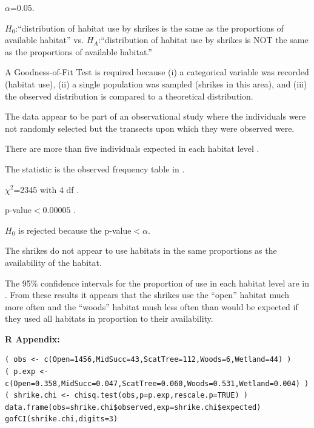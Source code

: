 \documentclass[10pt,openany]{book}\usepackage[]{graphicx}\usepackage[]{color}
\makeatletter
\newenvironment{kframe}{%
 \def\at@end@of@kframe{}%
 \ifinner\ifhmode%
  \def\at@end@of@kframe{\end{minipage}}%
  \begin{minipage}{\columnwidth}%
 \fi\fi%
 \def\FrameCommand##1{\hskip\@totalleftmargin \hskip-\fboxsep
 \colorbox{shadecolor}{##1}\hskip-\fboxsep
     \hskip-\linewidth \hskip-\@totalleftmargin \hskip\columnwidth}%
 \MakeFramed {\advance\hsize-\width
   \@totalleftmargin\z@ \linewidth\hsize
   \@setminipage}}%
 {\par\unskip\endMakeFramed%
 \at@end@of@kframe}
\newenvironment{knitrout}{}{} %
\makeatother
\begin{document}
\begin{Enumerate}
  \item $\alpha$=0.05.
  \item $H_{0}$:``distribution of habitat use by shrikes is the same as the proportions of available habitat'' vs. $H_{A}$:``distribution of habitat use by shrikes is NOT the same as the proportions of available habitat.''
  \item A Goodness-of-Fit Test is required because (i) a categorical variable was recorded (habitat use), (ii) a single population was sampled (shrikes in this area), and (iii) the observed distribution is compared to a theoretical distribution.
  \item The data appear to be part of an observational study where the individuals were not randomly selected but the transects upon which they were observed were.
  \item There are more than five individuals expected in each habitat level .
  \item The statistic is the observed frequency table in .
  \item $\chi^2$=2345 with 4 df .
  \item p-value$<0.00005$ .
  \item $H_{0}$ is rejected because the p-value$<\alpha$.
  \item The shrikes do not appear to use habitats in the same proportions as the availability of the habitat.
  \item The 95\% confidence intervals for the proportion of use in each habitat level are in . From these results it appears that the shrikes use the ``open'' habitat much more often and the ``woods'' habitat mush less often than would be expected if they used all habitats in proportion to their availability.
\end{Enumerate}

\begin{minipage}{\textwidth}
\textbf{R Appendix:}
\begin{knitrout}
\color{fgcolor}\begin{kframe}
\begin{verbatim}
( obs <- c(Open=1456,MidSucc=43,ScatTree=112,Woods=6,Wetland=44) )
( p.exp <- c(Open=0.358,MidSucc=0.047,ScatTree=0.060,Woods=0.531,Wetland=0.004) )
( shrike.chi <- chisq.test(obs,p=p.exp,rescale.p=TRUE) )
data.frame(obs=shrike.chi$observed,exp=shrike.chi$expected)
gofCI(shrike.chi,digits=3)
\end{verbatim}
\end{kframe}
\end{knitrout}
\end{minipage}
\end{document}
